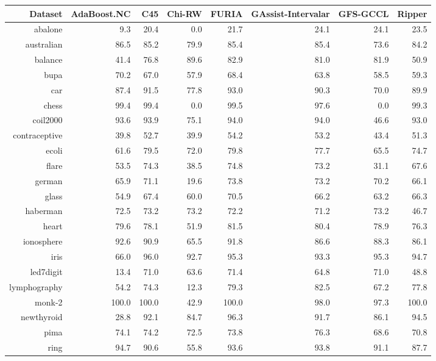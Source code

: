 \documentclass[a4paper,10pt]{article}
\begin{document}
\begin{table}[!htp]
\centering\scriptsize
\begin{tabular}{
|r|r|r|r|r|r|r|r|}
\hline
 
Dataset & AdaBoost.NC & C45 & Chi-RW & FURIA & GAssist-Intervalar & GFS-GCCL & Ripper\\
\hline
abalone & 9.3 & 20.4 & 0.0 & 21.7 & 24.1 & 24.1 & 23.5\\
\hline
australian & 86.5 & 85.2 & 79.9 & 85.4 & 85.4 & 73.6 & 84.2\\
\hline
balance & 41.4 & 76.8 & 89.6 & 82.9 & 81.0 & 81.9 & 50.9\\
\hline
bupa & 70.2 & 67.0 & 57.9 & 68.4 & 63.8 & 58.5 & 59.3\\
\hline
car & 87.4 & 91.5 & 77.8 & 93.0 & 90.3 & 70.0 & 89.9\\
\hline
chess & 99.4 & 99.4 & 0.0 & 99.5 & 97.6 & 0.0 & 99.3\\
\hline
coil2000 & 93.6 & 93.9 & 75.1 & 94.0 & 94.0 & 46.6 & 93.0\\
\hline
contraceptive & 39.8 & 52.7 & 39.9 & 54.2 & 53.2 & 43.4 & 51.3\\
\hline
ecoli & 61.6 & 79.5 & 72.0 & 79.8 & 77.7 & 65.5 & 74.7\\
\hline
flare & 53.5 & 74.3 & 38.5 & 74.8 & 73.2 & 31.1 & 67.6\\
\hline
german & 65.9 & 71.1 & 19.6 & 73.8 & 73.2 & 70.2 & 66.1\\
\hline
glass & 54.9 & 67.4 & 60.0 & 70.5 & 66.2 & 63.2 & 66.3\\
\hline
haberman & 72.5 & 73.2 & 73.2 & 72.2 & 71.2 & 73.2 & 46.7\\
\hline
heart & 79.6 & 78.1 & 51.9 & 81.5 & 80.4 & 78.9 & 76.3\\
\hline
ionosphere & 92.6 & 90.9 & 65.5 & 91.8 & 86.6 & 88.3 & 86.1\\
\hline
iris & 66.0 & 96.0 & 92.7 & 95.3 & 93.3 & 95.3 & 94.7\\
\hline
led7digit & 13.4 & 71.0 & 63.6 & 71.4 & 64.8 & 71.0 & 48.8\\
\hline
lymphography & 54.2 & 74.3 & 12.3 & 79.3 & 82.5 & 67.2 & 77.8\\
\hline
monk-2 & 100.0 & 100.0 & 42.9 & 100.0 & 98.0 & 97.3 & 100.0\\
\hline
newthyroid & 28.8 & 92.1 & 84.7 & 96.3 & 91.7 & 86.1 & 94.5\\
\hline
pima & 74.1 & 74.2 & 72.5 & 73.8 & 76.3 & 68.6 & 70.8\\
\hline
ring & 94.7 & 90.6 & 55.8 & 93.6 & 93.8 & 91.1 & 87.7\\

\end{tabular}
\end{table}
\end{document}
